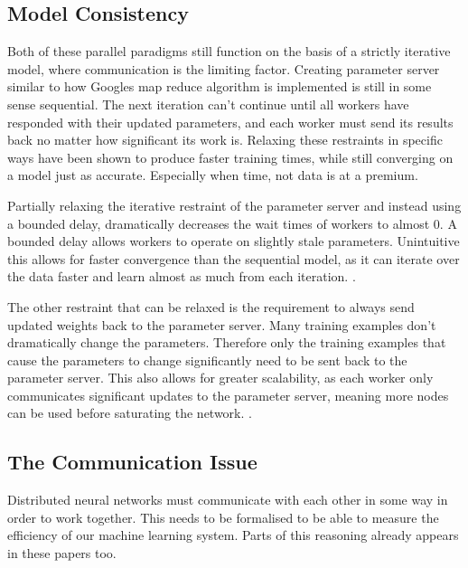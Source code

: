\subsection{Model Consistency}
Both of these parallel paradigms still function on the basis of a strictly
iterative model, where communication is the limiting factor. Creating parameter
server similar to how Googles map reduce algorithm is implemented
\cite{googlemapreduce2008} is still in some sense sequential. The next iteration
can't continue until all workers have responded with their updated parameters,
and each worker must send its results back no matter how significant its work
is. Relaxing these restraints in specific ways have been shown to produce faster
training times, while still converging on a model just as accurate. Especially
when time, not data is at a premium.\cite{li2014communication}
\par
Partially relaxing the iterative restraint of the parameter server and instead
using a bounded delay, dramatically decreases the wait times of workers to
almost 0. A bounded delay allows workers to operate on slightly stale
parameters. Unintuitive this allows for faster convergence than the sequential
model, as it can iterate over the data faster and learn almost as much from each
iteration. \cite{li2014communication}.
\par
The other restraint that can be relaxed is the requirement to always send
updated weights back to the parameter server. Many training examples don't
dramatically change the parameters. Therefore only the training examples that
cause the parameters to change significantly need to be sent back to the
parameter server. This also allows for greater scalability, as each worker only
communicates significant updates to the parameter server, meaning more nodes can
be used before saturating the network. \cite{li2014communication}. 

\subsection{The Communication Issue}


Distributed neural networks must communicate with each other in some way in
order to work together. This needs to be formalised to be able to measure the
efficiency of our machine learning system. Parts of this reasoning already
appears in these papers too. \cite{konevcny2016federated ,Ma2017DistributedOptimisation}


